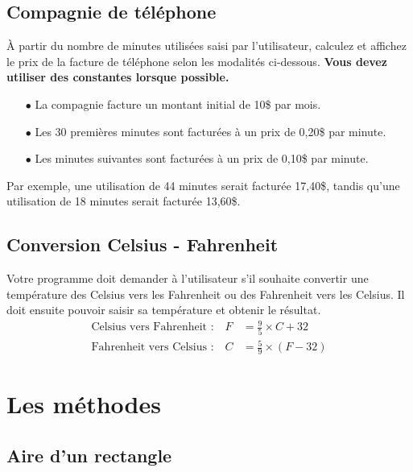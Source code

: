 \documentclass[12pt]{article}
\begin{document}
% 
%
%

\subsection{Compagnie de téléphone}

À partir du nombre de minutes utilisées saisi par l’utilisateur, calculez et affichez le prix de la facture de téléphone selon les modalités ci-dessous. \textbf{Vous devez utiliser des constantes lorsque possible.}

\begin{itemize}
	\item[$\bullet$] La compagnie facture un montant initial de 10\$ par mois.
	\item[$\bullet$] Les 30 premières minutes sont facturées à un prix de 0,20\$ par minute.
	\item[$\bullet$] Les minutes suivantes sont facturées à un prix de 0,10\$ par minute.
\end{itemize}

Par exemple, une utilisation de 44 minutes serait facturée 17,40\$, tandis qu'une utilisation de 18 minutes serait facturée 13,60\$.

%
%
%
%

\subsection{Conversion Celsius - Fahrenheit}

Votre programme doit demander à l'utilisateur s'il souhaite convertir une température des Celsius vers les Fahrenheit ou des Fahrenheit vers les Celsius. Il doit ensuite pouvoir saisir sa température et obtenir le résultat.
%
\begin{align*}
	\text{Celsius vers Fahrenheit :} \quad F &= \frac{9}{5} \times C + 32\\[5pt]
	\text{Fahrenheit vers Celsius :} \quad C &= \frac{5}{9} \times (F - 32)
\end{align*}


%
%

\section{Les méthodes}


\subsection{Aire d'un rectangle}
\end{document}
